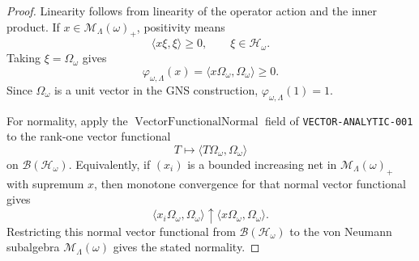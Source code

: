 \documentclass{article}
\newcommand{\cM}{\mathcal M}
\newcommand{\cH}{\mathcal H}
\newcommand{\cB}{\mathcal B}
\begin{document}
\begin{proof}
Linearity follows from linearity of the operator action and the inner product.
If \(x\in\cM_\Lambda(\omega)_+\), positivity means
\[
  \langle x\xi,\xi\rangle\ge0,\qquad \xi\in\cH_\omega .
\]
Taking \(\xi=\Omega_\omega\) gives
\[
  \varphi_{\omega,\Lambda}(x)
  =\langle x\Omega_\omega,\Omega_\omega\rangle\ge0.
\]
Since \(\Omega_\omega\) is a unit vector in the GNS construction,
\(\varphi_{\omega,\Lambda}(1)=1\).

For normality, apply the \(\operatorname{VectorFunctionalNormal}\) field of
\texttt{VECTOR-ANALYTIC-001} to the rank-one vector functional
\[
  T\mapsto\langle T\Omega_\omega,\Omega_\omega\rangle
\]
on \(\cB(\cH_\omega)\).  Equivalently, if \((x_i)\) is a bounded increasing
net in \(\cM_\Lambda(\omega)_+\) with supremum \(x\), then monotone
convergence for that normal vector functional gives
\[
  \langle x_i\Omega_\omega,\Omega_\omega\rangle
  \uparrow
  \langle x\Omega_\omega,\Omega_\omega\rangle .
\]
Restricting this normal vector functional from \(\cB(\cH_\omega)\) to the
von Neumann subalgebra \(\cM_\Lambda(\omega)\) gives the stated normality.
\end{proof}
\end{document}
